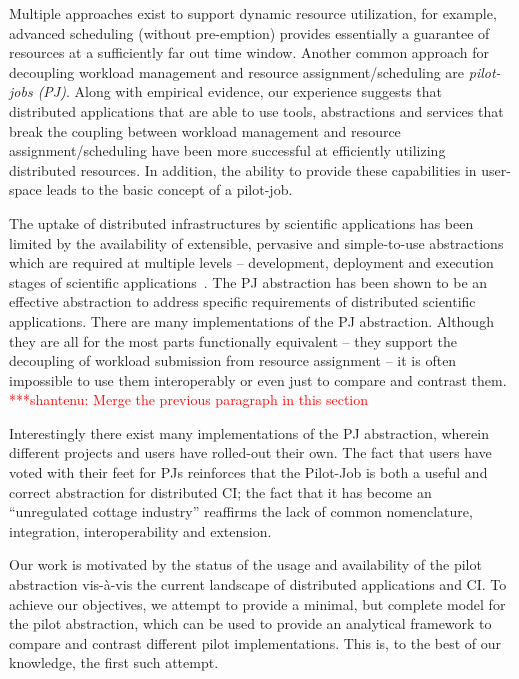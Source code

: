 \documentclass[conference,final]{IEEEtran}
\newcommand{\jhanote}[1]{ {\textcolor{red} { ***shantenu: #1 }}}
\newcommand{\jhanote}[1]{}
\begin{document}
Multiple approaches exist to support dynamic resource utilization, for
example, advanced scheduling (without pre-emption) provides
essentially a guarantee of resources %
at a sufficiently far out time window.  Another common approach for
decoupling workload management and resource assignment/scheduling are
\emph{pilot-jobs (PJ)}. Along with empirical evidence, our experience
suggests that distributed applications that are able to use tools,
abstractions and services that break the coupling between workload
management and resource assignment/scheduling have been more
successful at efficiently utilizing distributed resources. In
addition, the ability to provide these capabilities in user-space
leads to the basic concept of a pilot-job.

The uptake of distributed infrastructures by scientific applications
has been limited by the availability of extensible, pervasive and
simple-to-use abstractions which are required at multiple levels –
development, deployment and execution stages of scientific
applications~\cite{dpagrid2009}. The PJ abstraction has been shown to
be an effective abstraction to address specific requirements of
distributed scientific applications. There are many implementations of
the PJ abstraction.  Although they are all for the most parts
functionally equivalent -- they support the decoupling of workload
submission from resource assignment -- it is often impossible to use
them interoperably or even just to compare and contrast them.
\jhanote{Merge the previous paragraph in this section}


Interestingly there exist many implementations of the PJ abstraction,
wherein different projects and users have rolled-out their own. The
fact that users have voted with their feet for PJs reinforces that the
Pilot-Job is both a useful and correct abstraction for distributed CI;
the fact that it has become an ``unregulated cottage industry''
reaffirms the lack of common nomenclature, integration,
interoperability and extension.

Our work is motivated by the status of the usage and availability of
the pilot abstraction vis-\`{a}-vis the current landscape of
distributed applications and CI.  To achieve our objectives, we
attempt to provide a minimal, but complete model for the pilot
abstraction, which can be used to provide an analytical framework to
compare and contrast different pilot implementations. This is, to the
best of our knowledge, the first such attempt.
\end{document}
